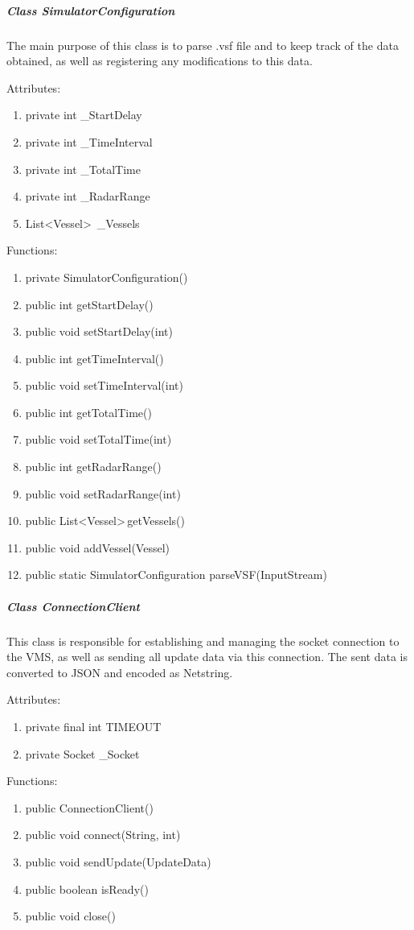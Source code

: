 \documentclass{article}
\begin{document}
\subparagraph{Class SimulatorConfiguration}
The main purpose of this class is to parse .vsf file and to keep track of the data obtained, as well as registering any modifications to this data.

Attributes:
\begin{enumerate}
    \item private int \_StartDelay
    \item private int \_TimeInterval
    \item private int \_TotalTime
    \item private int \_RadarRange
    \item List\textless Vessel\textgreater \, \_Vessels
\end {enumerate}

Functions:
\begin{enumerate}
	\item private SimulatorConfiguration()
	\item public int getStartDelay()
	\item public void setStartDelay(int)
	\item public int getTimeInterval()
	\item public void setTimeInterval(int)
	\item public int getTotalTime()
	\item public void setTotalTime(int)
	\item public int getRadarRange()
	\item public void setRadarRange(int)
	\item public List\textless Vessel\textgreater  \,getVessels()
	\item public void addVessel(Vessel)
	\item public static SimulatorConfiguration parseVSF(InputStream)
\end{enumerate}

\subparagraph{Class ConnectionClient}
This class is responsible for establishing and managing the socket connection to the VMS, as well as sending all update data via this connection. The sent data is converted to JSON and encoded as Netstring.

Attributes:
\begin{enumerate}
	\item private final int TIMEOUT
    \item private Socket \_Socket
\end {enumerate}

Functions:
\begin{enumerate}
	\item public ConnectionClient()
	\item public void connect(String, int)
	\item public void sendUpdate(UpdateData)
	\item public boolean isReady()
	\item public void close()
\end{enumerate}
\end{document}
